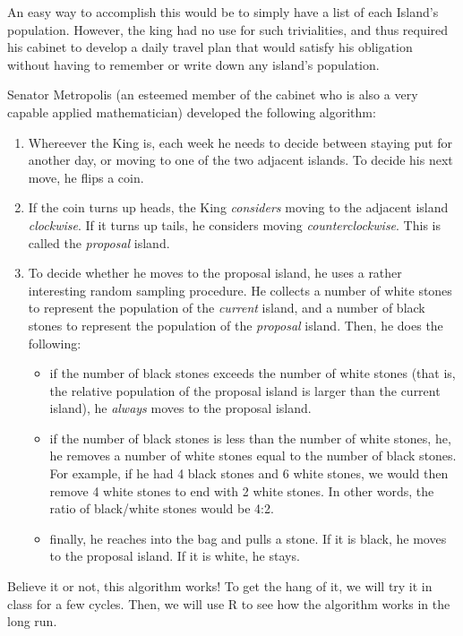 \documentclass[11pt]{article}
\begin{document}
An easy way to accomplish this would be to simply have a list of each Island's population.  However, the king had no use for such trivialities, and thus required his cabinet to develop a daily travel plan that would satisfy his obligation without having to remember or write down any island's population.

Senator Metropolis (an esteemed member of the cabinet who is also a very capable applied mathematician) developed the following algorithm:

\begin{enumerate}
\item Whereever the King is, each week he needs to decide between staying put for another day, or moving to one of the two adjacent islands.  To decide his next move, he flips a coin.

\item If the coin turns up heads, the King \emph{considers} moving to the adjacent island \emph{clockwise}.  If it turns up tails, he considers moving \emph{counterclockwise}.  This is called the \emph{proposal} island.

\item To decide whether he moves to the proposal island, he uses a rather interesting random sampling procedure.  He collects a number of white stones to represent the population of the \emph{current} island, and a number of black stones to represent the population of the \emph{proposal} island.  Then, he does the following:
\begin{itemize}
\item if the number of black stones exceeds the number of white stones (that is, the relative population of the proposal island is larger than the current island), he \emph{always} moves to the proposal island.
\item if the number of black stones is less than the number of white stones, he, he removes a number of white stones equal to the number of black stones.  For example, if he had 4 black stones and 6 white stones, we would then remove 4 white stones to end with 2 white stones.  In other words, the ratio of black/white stones would be 4:2.
\item finally, he reaches into the bag and pulls a stone.  If it is black, he moves to the proposal island.  If it is white, he stays.
\end{itemize}
\end{enumerate}

Believe it or not, this algorithm works!  To get the hang of it, we will try it in class for a few cycles. Then, we will use R to see how the algorithm works in the long run.
\end{document}
